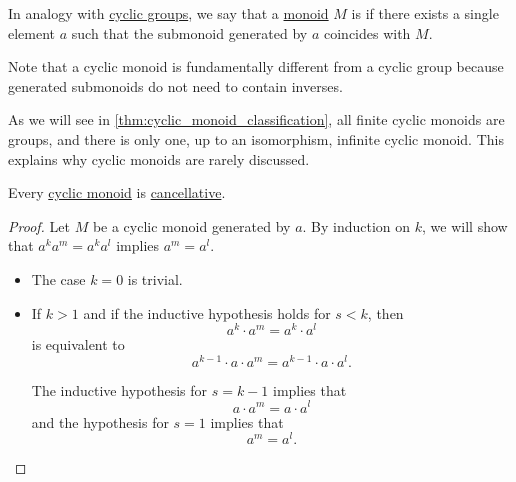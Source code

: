 \begin{definition}\label{def:cyclic_monoid}
  In analogy with \hyperref[def:cyclic_group]{cyclic groups}, we say that a \hyperref[def:monoid]{monoid} \( M \) is  if there exists a single element \( a \) such that the submonoid generated by \( a \) coincides with \( M \).
\end{definition}
\begin{comments}
  \item Note that a cyclic monoid is fundamentally different from a cyclic group because generated submonoids do not need to contain inverses.
  \item As we will see in \cref{thm:cyclic_monoid_classification}, all finite cyclic monoids are groups, and there is only one, up to an isomorphism, infinite cyclic monoid. This explains why cyclic monoids are rarely discussed.
\end{comments}

\begin{lemma}\label{thm:cyclic_monoid_cancellative}
  Every \hyperref[def:cyclic_monoid]{cyclic monoid} is \hyperref[def:binary_operation/cancellative]{cancellative}.
\end{lemma}
\begin{proof}
  Let \( M \) be a cyclic monoid generated by \( a \). By induction on \( k \), we will show that \( a^k a^m = a^k a^l \) implies \( a^m = a^l \).
  \begin{itemize}
    \item The case \( k = 0 \) is trivial.
    \item If \( k > 1 \) and if the inductive hypothesis holds for \( s < k \), then
    \begin{equation*}
      a^k \cdot a^m = a^k \cdot a^l
    \end{equation*}
    is equivalent to
    \begin{equation*}
      a^{k - 1} \cdot a \cdot a^m = a^{k - 1} \cdot a \cdot a^l.
    \end{equation*}

    The inductive hypothesis for \( s = k - 1 \) implies that
    \begin{equation*}
      a \cdot a^m = a \cdot a^l
    \end{equation*}
    and the hypothesis for \( s = 1 \) implies that
    \begin{equation*}
      a^m = a^l.
    \end{equation*}
  \end{itemize}
\end{proof}

